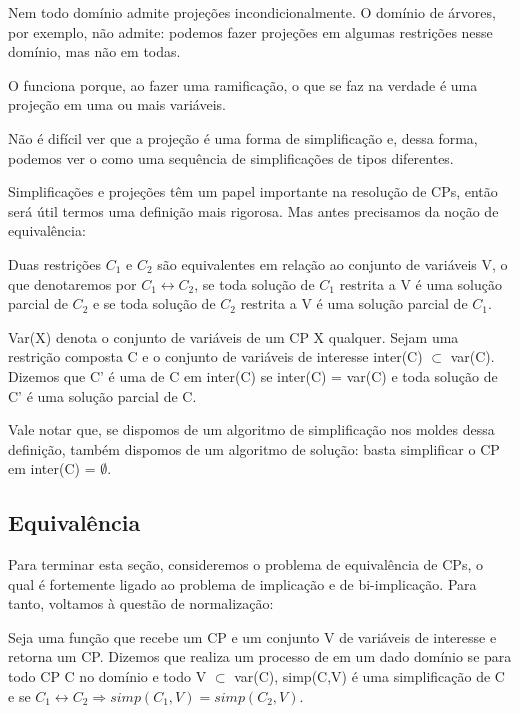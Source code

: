 Nem todo domínio admite projeções incondicionalmente. O domínio de árvores, por exemplo, não admite: podemos fazer projeções em algumas restrições nesse domínio, mas não em todas.

O  funciona porque, ao fazer uma ramificação, o que se faz na verdade é uma projeção em uma ou mais variáveis.

Não é difícil ver que a projeção é uma forma de simplificação e, dessa forma, podemos ver o  como uma sequência de simplificações de tipos diferentes.

Simplificações e projeções têm um papel importante na resolução de CPs, então será útil termos uma definição mais rigorosa. Mas antes precisamos da noção de equivalência:

\begin{definition}
  Duas restrições  $C_1$ e $C_2$ são equivalentes em relação ao
  conjunto de variáveis V, o que denotaremos por $C_1 \leftrightarrow C_2$, se toda solução de $C_1$
  restrita a V é uma solução parcial de $C_2$ e se toda solução de $C_2$ restrita a V é uma solução parcial de $C_1$.
\end{definition}

\begin{definition}
  Var(X) denota o conjunto de variáveis de um CP X qualquer. Sejam uma restrição composta C e o conjunto de variáveis de interesse inter(C) $\subset$ var(C). Dizemos que C' é uma  de C em inter(C) se inter(C) = var(C) e toda solução de C' é uma solução parcial de C.
\end{definition}

Vale notar que, se dispomos de um algoritmo de simplificação nos moldes dessa definição, também dispomos de um algoritmo de solução: basta simplificar o CP em inter(C) = $\emptyset$.

\subsection{Equivalência}

  Para terminar esta seção, consideremos o problema de equivalência de CPs, o qual é fortemente ligado ao problema de implicação e de bi-implicação. Para tanto, voltamos à questão de normalização:

\begin{definition}
    Seja  uma função que recebe um CP e um conjunto V de variáveis de interesse e retorna um CP. Dizemos que  realiza um processo de  em um dado domínio se para todo CP C no domínio e todo V $\subset$ var(C), simp(C,V) é uma simplificação de C e se $C_1 \leftrightarrow C_2 \Rightarrow simp(C_1,V) = simp(C_2,V)$.
\end{definition}

